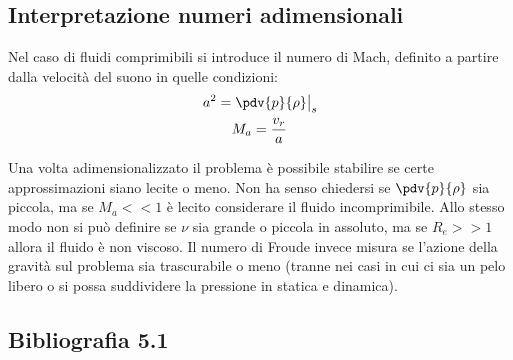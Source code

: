 \subsection{Interpretazione numeri adimensionali}
Nel caso di fluidi comprimibili si introduce il numero di Mach, definito a partire dalla velocità del suono in quelle condizioni:
%
	\begin{equation*}
		\begin{gathered}
			\left. a^2 = \pdv{p}{\rho} \right|_s\\
			M_a = \frac{v_r}{a}		
		\end{gathered}
	\end{equation*}
%

Una volta adimensionalizzato il problema è possibile stabilire se certe approssimazioni siano lecite o meno.
Non ha senso chiedersi se $\pdv{p}{\rho}$ sia piccola, ma se $M_a << 1$ è lecito considerare il fluido incomprimibile.
Allo stesso modo non si può definire se $\nu$ sia grande o piccola in assoluto, ma se $R_e >> 1$  allora il fluido è non viscoso.
Il numero di Froude invece misura se l'azione della gravità sul problema sia trascurabile o meno (tranne nei casi in cui ci sia un pelo libero o si possa suddividere la pressione in statica e dinamica).

\subsection*{Bibliografia 5.1}
\cite[Cap.\ 10.2]{CengelCimbala}\\
\cite[Cap.\ 8.1]{PnueliGutfinger}